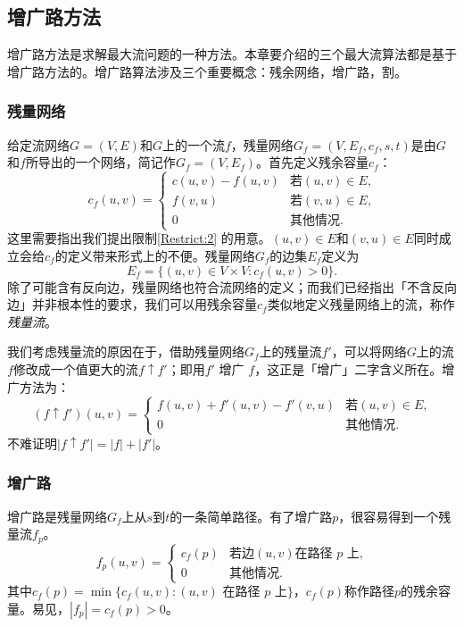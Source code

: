 \documentclass[fontset=ubuntu]{ctexbook}
\begin{document}
    \subsection{增广路方法}
    增广路方法是求解最大流问题的一种方法。本章要介绍的三个最大流算法都是基于增广路方法的。增广路算法涉及三个重要概念：残余网络，增广路，割。
    \subsubsection*{残量网络}
    给定流网络$G=(V,E)$和$G$上的一个流$f$，残量网络$G_f=(V,E_f,c_f, s, t)$是由$G$和$f$所导出的一个网络，简记作$G_f=(V,E_f)$。首先定义残余容量$c_f$：
    \[
    c_f(u,v) =
    \begin{cases}
        c(u,v) - f(u,v) & \text{若$(u,v)\in E$,}\\
        f(v,u) & \text{若$(v,u)\in E$,} \\
        0 & \text{其他情况.}
    \end{cases}
    \]
    这里需要指出我们提出限制\ref{Restrict:2} 的用意。$(u,v)\in E$和$(v,u)\in E$同时成立会给$c_f$的定义带来形式上的不便。残量网络$G_f$的边集$E_f$定义为
    \[
    E_f = \{(u,v)\in V\times V\colon c_f(u,v)>0\}.
    \]
    除了可能含有反向边，残量网络也符合流网络的定义；而我们已经指出「不含反向边」并非根本性的要求，我们可以用残余容量$c_f$类似地定义残量网络上的流，称作\emph{残量流}。

    我们考虑残量流的原因在于，借助残量网络$G_f$上的残量流$f'$，可以将网络$G$上的流$f$修改成一个值更大的流$f\uparrow f'$；即用$f'$ 增广 $f$，这正是「增广」二字含义所在。增广方法为：
    \[
    (f\uparrow f')(u,v) =\begin{cases}
    f(u,v) + f'(u,v) - f'(v,u) & \text{若$(u,v)\in E$,} \\
    0 & \text{其他情况.}
\end{cases}
    \]
    不难证明$|f\uparrow f'| = |f| + |f'|$。
    \subsubsection{增广路}
    增广路是残量网络$G_f$上从$s$到$t$的一条简单路径。有了增广路$p$，很容易得到一个残量流$f_p$。
    \[
    f_p(u,v) =\begin{cases}
    c_f(p) & \text{若边$(u,v)$在路径 $p$ 上,}\\
    0 & \text{其他情况.}
\end{cases}
    \]
    其中$c_f(p) = \min\{c_f(u,v)\colon (u,v)\text{ 在路径 }p\text{ 上} \}$，$c_f(p)$称作路径$p$的残余容量。易见，$|f_p| = c_f(p) > 0$。
\end{document}
